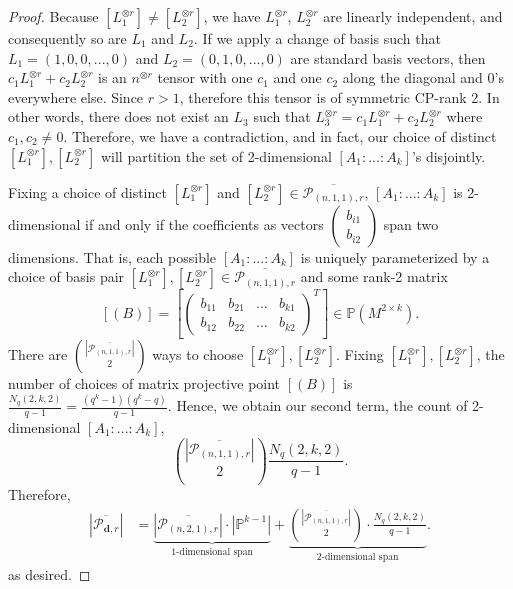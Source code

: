 \documentclass[a4paper]{cas-sc}
\newcommand{\dd}{\mathbf{d}}    %
\begin{document}
\begin{proof}
        Because $\left[L_1^{\otimes r}\right] \neq \left[L_2^{\otimes r}\right]$, we have $L_1^{\otimes r}$, $L_2^{\otimes r}$ are linearly independent, and consequently so are $L_1$ and $L_2$. If we apply a change of basis such that $L_1 = (1, 0, 0, ..., 0)$ and $L_2 = (0, 1, 0, ..., 0)$ are standard basis vectors, then $c_1L_1^{\otimes r} + c_2L_2^{\otimes r}$ is an $n^{\otimes r}$ tensor with one $c_1$ and one $c_2$ along the diagonal and 0's everywhere else. Since $r > 1$, therefore this tensor is of symmetric CP-rank 2. In other words, there does not exist an $L_3$ such that $L_3^{\otimes r} = c_1L_1^{\otimes r} + c_2L_2^{\otimes r}$ where $c_1, c_2 \neq 0$. Therefore, we have a contradiction, and in fact, our choice of distinct $\left[L_1^{\otimes r}\right],\left[L_2^{\otimes r}\right]$ will partition the set of 2-dimensional $\left[A_1:...:A_k\right]$'s disjointly.
        
        Fixing a choice of distinct $\left[L_1^{\otimes r}\right]$ and $\left[L_2^{\otimes r}\right] \in \overline{\mathcal{P}_{(n,1,1),r}}$, $\left[A_1:...:A_k\right]$ is 2-dimensional if and only if the coefficients as vectors $\left(\begin{array}{c} b_{i1} \\ b_{i2}\end{array}\right)$ span two dimensions. That is, each possible $\left[A_1:...:A_k\right]$ is uniquely parameterized by a choice of basis pair $\left[L_1^{\otimes r}\right], \left[L_2^{\otimes r}\right] \in \overline{\mathcal{P}_{(n,1,1),r}}$ and some rank-2 matrix
        \[
        \left[(B)\right] = \left[\left(\begin{array}{cccc}
            b_{11} & b_{21} & \hdots & b_{k1} \\
            b_{12} & b_{22} & \hdots & b_{k2} 
        \end{array}\right)^T\right] \in \mathbb{P}(M^{2 \times k}).
        \]
        There are $\binom{\left|\overline{\mathcal{P}_{(n,1,1), r}}\right|}{2}$ ways to choose $\left[L_1^{\otimes r}\right],\left[L_2^{\otimes r}\right]$. Fixing $\left[L_1^{\otimes r}\right],\left[L_2^{\otimes r}\right]$, the number of choices of matrix projective point $\left[(B)\right]$ is $\frac{N_{q}(2,k,2)}{q - 1} = \frac{(q^k - 1)(q^k - q)}{q-1}$. Hence, we obtain our second term, the count of 2-dimensional $\left[A_1:...:A_k\right]$,
        \[
            \binom{\left|\overline{\mathcal{P}_{(n,1,1), r}}\right|}{2} \frac{N_{q}(2,k,2)}{q - 1}.
        \]
        Therefore,
        \begin{align*}
            \left|\overline{\mathcal{P}_{\dd, r}}\right| 
            &= \underbrace{\left|\overline{\mathcal{P}_{(n,2,1),r}}\right| \cdot \left|\mathbb{P}^{k-1}\right|}_{\text{$1$-dimensional span}}
            + \underbrace{\binom{\left|\overline{\mathcal{P}_{(n,1,1),r}}\right|}{2} \cdot \frac{N_q(2,k,2)}{q-1}}_{\text{$2$-dimensional span}}.
        \end{align*}
        as desired.
    \end{proof}
\end{document}
